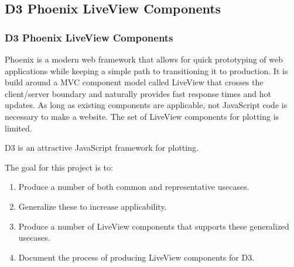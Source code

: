 \subsection{D3 Phoenix LiveView Components}
\begin{frame}
    \frametitle{D3 Phoenix LiveView Components}
    \vspace{0mm}
    Phoenix is a modern web framework that allows for quick prototyping of web applications while keeping a simple path to transitioning it to production. It is build around a MVC component model called LiveView that crosses the client/server boundary and naturally provides fast response times and hot updates. As long as existing components are applicable, not JavaScript code is necessary to make a website. The set of LiveView components for plotting is limited.
    
    \vspace{3mm}
    D3 is an attractive JavaScript framework for plotting.
    
    \vspace{3mm}
    The goal for this project is to:
    \begin{enumerate}
      \item Produce a number of both common and representative usecases.
      \item Generalize these to increase applicability.
      \item Produce a number of LiveView components that supports these generalized usecases.
      \item Document the process of producing LiveView components for D3.
    \end{enumerate}

\end{frame}

